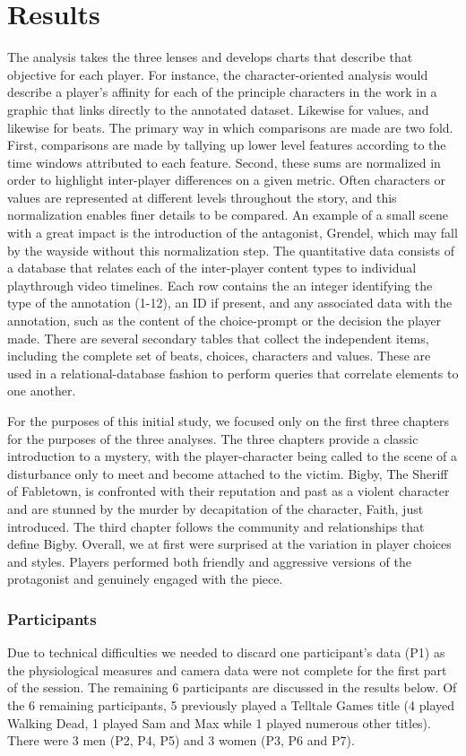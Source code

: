 \section{Results}
\label{sec:org5a44689}
The analysis takes the three lenses and develops charts that describe
that objective for each player. For instance, the character-oriented
analysis would describe a player's affinity for each of the principle
characters in the work in a graphic that links directly to the
annotated dataset. Likewise for values, and likewise for beats. The
primary way in which comparisons are made are two fold. First,
comparisons are made by tallying up lower level features according to
the time windows attributed to each feature. Second, these sums are
normalized in order to highlight inter-player differences on a given
metric. Often characters or values are represented at different levels
throughout the story, and this normalization enables finer details to
be compared. An example of a small scene with a great impact is the
introduction of the antagonist, Grendel, which may fall by the wayside
without this normalization step. The quantitative data consists of a
database that relates each of the inter-player content types to
individual playthrough video timelines. Each row contains the an
integer identifying the type of the annotation (1-12), an ID if
present, and any associated data with the annotation, such as the
content of the choice-prompt or the decision the player made. There
are several secondary tables that collect the independent items,
including the complete set of beats, choices, characters and
values. These are used in a relational-database fashion to perform
queries that correlate elements to one another.

For the purposes of this initial study, we focused only on the first
three chapters for the purposes of the three analyses. The three
chapters provide a classic introduction to a mystery, with the
player-character being called to the scene of a disturbance only to
meet and become attached to the victim. Bigby, The Sheriff of
Fabletown, is confronted with their reputation and past as a violent
character and are stunned by the murder by decapitation of the
character, Faith, just introduced. The third chapter follows the
community and relationships that define Bigby. Overall, we at first
were surprised at the variation in player choices and styles. Players
performed both friendly and aggressive versions of the protagonist and
genuinely engaged with the piece.

\subsubsection{Participants}
\label{sec:org3875209}
Due to technical difficulties we needed to discard one participant's
data (P1) as the physiological measures and camera data were not
complete for the first part of the session. The remaining 6
participants are discussed in the results below. Of the 6 remaining
participants, 5 previously played a Telltale Games title (4 played Walking
Dead, 1 played Sam and Max while 1 played numerous other
titles). There were 3 men (P2, P4, P5) and 3 women (P3, P6 and P7).

